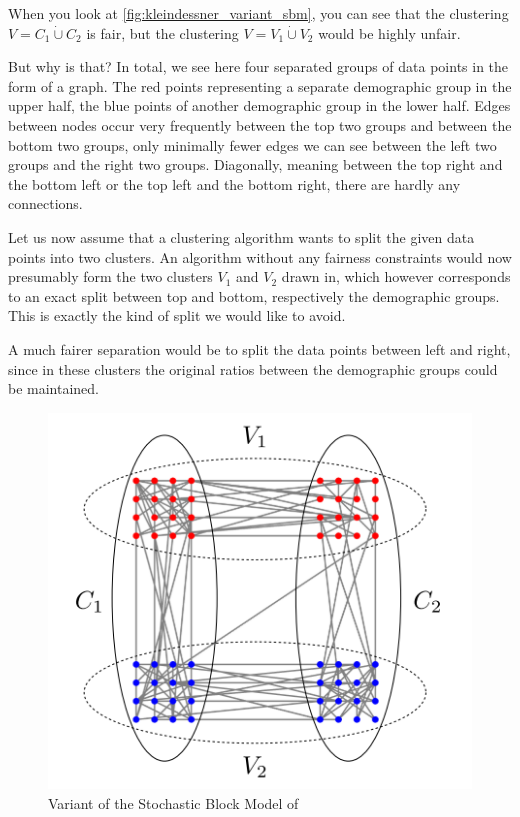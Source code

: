 When you look at \autoref{fig:kleindessner_variant_sbm}, you can see that the clustering $V = C_{1} \dot\cup C_{2}$ is fair, but the clustering $V = V_{1} \dot\cup V_{2}$ would be highly unfair. \autocite[4]{Kleindessner2019}

But why is that? In total, we see here four separated groups of data points in the form of a graph. The red points representing a separate demographic group in the upper half, the blue points of another demographic group in the lower half. Edges between nodes occur very frequently between the top two groups and between the bottom two groups, only minimally fewer edges we can see between the left two groups and the right two groups. Diagonally, meaning between the top right and the bottom left or the top left and the bottom right, there are hardly any connections.

Let us now assume that a clustering algorithm wants to split the given data points into two clusters. An algorithm without any fairness constraints would now presumably form the two clusters $V_{1}$ and $V_{2}$ drawn in, which however corresponds to an exact split between top and bottom, respectively the demographic groups. This is exactly the kind of split we would like to avoid.

A much fairer separation would be to split the data points between left and right, since in these clusters the original ratios between the demographic groups could be maintained.

\begin{figure}
    \centering
    \includegraphics[width=0.9\linewidth]{images/kleindessner_variant_sbm.png}
    \caption{Variant of the Stochastic Block Model of \textcite[4]{Kleindessner2019}}
    \label{fig:kleindessner_variant_sbm}
\end{figure}